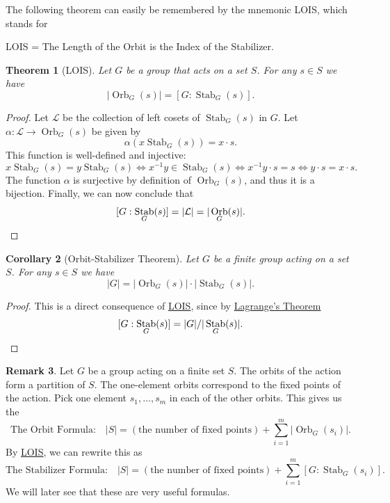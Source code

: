 \documentclass[12pt]{report}
\newtheorem{theorem}{Theorem}[chapter]
\newtheorem{corollary}[theorem]{Corollary}
\numberwithin{equation}{section}
\numberwithin{theorem}{chapter}
\theoremstyle{definition}
\newtheorem*{basic properties}{Basic Properties}
\newtheorem*{Important Remark}{Important Remark}
\newtheorem{remark}[theorem]{Remark}
\DeclareMathOperator{\Orb}{Orb}
\DeclareMathOperator{\Stab}{Stab}
\begin{document}
The following theorem can easily be remembered by the mnemonic LOIS, which stands for
\vspace{-0.5em}
\begin{center}
LOIS = The Length of the Orbit is the Index of the Stabilizer.	
\end{center}

\vspace{0.2em}

\begin{theorem}[LOIS]\label{lois}
Let $G$ be a group that acts on a set $S$. For any $s \in S$ we have
$$|\Orb_G(s)| = [G: \Stab_G(s)].$$
\end{theorem}

\begin{proof} 
Let $\mathcal{L}$ be the collection of left cosets of $\Stab_G(s)$ in $G$. Let $\alpha: \mathcal{L} \to \Orb_G(s)$ be given by
$$\alpha(x \Stab_G(s)) = x \cdot s.$$ 
This function is well-defined and injective: 
$$
x \Stab_G(s) = y \Stab_G(s)\iff x^{-1}y \in \Stab_G(s) \iff x^{-1}y \cdot s = s \iff 
y \cdot s = x \cdot s.
$$
The function $\alpha$ is surjective by definition of $\Orb_G(s)$, and thus it is a bijection. Finally, we can now conclude that 
$$[G: \Stab_G(s)] = |\mathcal{L}| = |\Orb_G(s)|.\qedhere$$
\end{proof}




\begin{corollary}[Orbit-Stabilizer Theorem]\label{Orbit-Stabilizer Theorem}
Let $G$ be a finite group acting on a set $S$. For any $s \in S$ we have
$$|G|=|\Orb_G(s)| \cdot |\Stab_G(s)|.$$
\end{corollary}

\begin{proof}
This is a direct consequence of \hyperref[lois]{LOIS}, since by \hyperref[Lagrange]{Lagrange's Theorem} 
$$[G: \Stab_G(s)]=|G|/|\Stab_G(s)|.\qedhere$$
\end{proof}


\begin{remark}\label{Orbit Equation}
Let $G$ be a group acting on a finite set $S$. The orbits of the action form a partition of $S$. The one-element orbits correspond to the fixed points of the action. Pick one element $s_1, \ldots, s_m$ in each of the other orbits. This gives us the
$$\text{The Orbit Formula:} \hspace{1em} |S| = (\text{the number of fixed points}) + \sum_{i=1}^m |\Orb_G(s_i)|.$$
By \hyperref[lois]{LOIS}, we can rewrite this as
$$\text{The Stabilizer Formula:} \hspace{1em} |S| = (\text{the number of fixed points}) + \sum_{i=1}^m [G: \Stab_G(s_i)].$$
We will later see that these are very useful formulas.
\end{remark}
\end{document}

